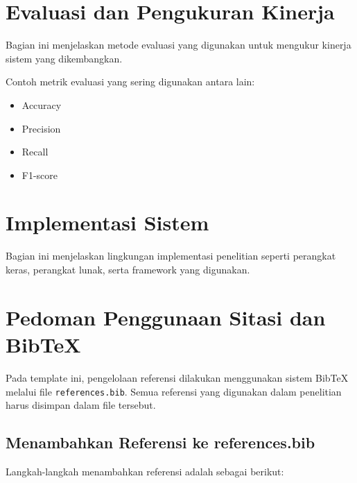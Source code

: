 \section{Evaluasi dan Pengukuran Kinerja}

Bagian ini menjelaskan metode evaluasi yang digunakan untuk mengukur
kinerja sistem yang dikembangkan.

Contoh metrik evaluasi yang sering digunakan antara lain:

\begin{itemize}
\item Accuracy
\item Precision
\item Recall
\item F1-score
\end{itemize}

\section{Implementasi Sistem}

Bagian ini menjelaskan lingkungan implementasi penelitian seperti
perangkat keras, perangkat lunak, serta framework yang digunakan.

\section{Pedoman Penggunaan Sitasi dan BibTeX}

Pada template ini, pengelolaan referensi dilakukan menggunakan sistem
BibTeX melalui file \texttt{references.bib}. Semua referensi yang digunakan
dalam penelitian harus disimpan dalam file tersebut.

\subsection{Menambahkan Referensi ke references.bib}

Langkah-langkah menambahkan referensi adalah sebagai berikut:

